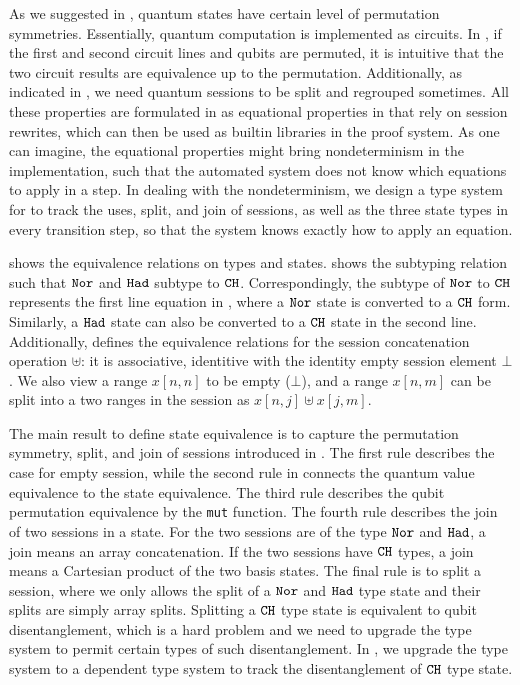 As we suggested in , quantum states have certain level of permutation symmetries. Essentially, quantum computation is implemented as circuits. In , if the first and second circuit lines and qubits are permuted, it is intuitive that the two circuit results are equivalence up to the permutation. Additionally, as indicated in , we need quantum sessions to be split and regrouped sometimes. All these properties are formulated in \qafny as equational properties in  that rely on session rewrites, which can then be used as builtin libraries in the proof system. As one can imagine, the equational properties might bring nondeterminism in the \qafny implementation, such that the automated system does not know which equations to apply in a step. In dealing with the nondeterminism, we design a type system for \qafny to track the uses, split, and join of sessions, as well as the three state types in every transition step, so that the system knows exactly how to apply an equation.

 shows the equivalence relations on types and states.
 shows the subtyping relation such that $\texttt{Nor}$ and $\texttt{Had}$ subtype to $\texttt{CH}$.
Correspondingly, the subtype of $\texttt{Nor}$ to $\texttt{CH}$ represents the first line equation in , where a $\texttt{Nor}$ state is converted to a $\texttt{CH}$ form. Similarly, a $\texttt{Had}$ state can also be converted to a $\texttt{CH}$ state in the second line.
Additionally,  defines the equivalence relations for the session concatenation operation $\uplus$: it is associative, identitive with the identity empty session element $\bot$.
We also view a range $x[n,n]$ to be empty ($\bot$), and a range $x[n,m]$ can be split into a two ranges in the session as $x[n,j] \uplus x[j,m]$. 

The main result to define state equivalence is to capture the permutation symmetry, split, and join of sessions introduced in . The first rule describes the case for empty session, while the second rule in  connects the quantum value equivalence to the state equivalence.
The third rule describes the qubit permutation equivalence by the \texttt{mut} function.
The fourth rule describes the join of two sessions in a state.
For the two sessions are of the type $\texttt{Nor}$ and $\texttt{Had}$, a join means an array concatenation.
If the two sessions have $\texttt{CH}$ types, a join means a Cartesian product of the two basis states.
The final rule is to split a session, where we only allows the split of a $\texttt{Nor}$ and $\texttt{Had}$ type state and their splits are simply array splits. Splitting a $\texttt{CH}$ type state is equivalent to qubit disentanglement, which is a hard problem and we need to upgrade the type system to permit certain types of such disentanglement. In , we upgrade the \qafny type system to a dependent type system to track the disentanglement of $\texttt{CH}$ type state.


